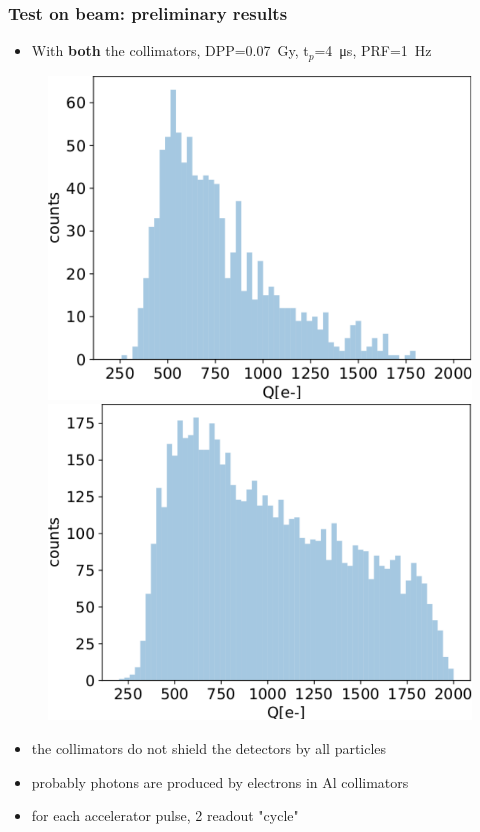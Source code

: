     \begin{frame}[noframenumbering]
        \frametitle{Test on beam: preliminary results}
        \begin{itemize}
            \item With \textbf{both} the collimators, DPP=\SI{0.07}{Gy}, t$_p$=\SI{4}{\us}, PRF=\SI{1}{Hz}
        \end{itemize}
        \medskip
        \begin{figure}
            \includegraphics[width=0.49\linewidth]{figures/test_beam/Q1_17_11.pdf}
            \includegraphics[width=.49\linewidth]{figures/test_beam/Q2_17_11.pdf}
        \end{figure}
        \begin{itemize}
            \item the collimators do not shield the detectors by all particles
            \item probably photons are produced by electrons in Al collimators
            \item for each accelerator pulse, 2 readout "cycle"  
        \end{itemize}
    \end{frame} 
    
